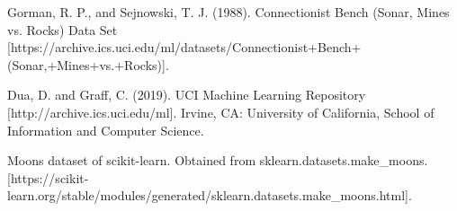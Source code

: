 \documentclass[12pt]{article}
\begin{document}
\begin{thebibliography}{9}
Gorman, R. P., and Sejnowski, T. J. (1988). Connectionist Bench (Sonar, Mines vs. Rocks) Data Set [https://archive.ics.uci.edu/ml/datasets/Connectionist+Bench+(Sonar,+Mines+vs.+Rocks)].

Dua, D. and Graff, C. (2019). UCI Machine Learning Repository [http://archive.ics.uci.edu/ml]. Irvine, CA: University of California, School of Information and Computer Science.

Moons dataset of scikit-learn. Obtained from sklearn.datasets.make\_moons.
[https://scikit-learn.org/stable/modules/generated/sklearn.datasets.make\_moons.html].
\end{thebibliography}
\end{document}
